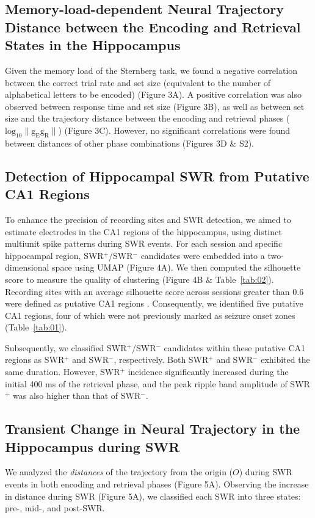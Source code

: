 \documentclass[final,3p,times,twocolumn]{elsarticle}
\begin{document}
\subsection{Memory-load-dependent Neural Trajectory Distance between the Encoding and Retrieval States in the Hippocampus}
Given the memory load of the Sternberg task, we found a negative correlation between the correct trial rate and set size (equivalent to the number of alphabetical letters to be encoded) (Figure 3A). A positive correlation was also observed between response time and set size (Figure 3B), as well as between set size and the trajectory distance between the encoding and retrieval phases ($\mathrm{log_{10}\lVert g_{E}g_{R} \rVert}$) (Figure 3C). However, no significant correlations were found between distances of other phase combinations (Figures 3D \& S2).

\subsection{Detection of Hippocampal SWR from Putative CA1 Regions}
To enhance the precision of recording sites and SWR detection, we aimed to estimate electrodes in the CA1 regions of the hippocampus, using distinct multiunit spike patterns during SWR events. For each session and specific hippocampal region, SWR$^+$/SWR$^-$ candidates were embedded into a two-dimensional space using UMAP (Figure 4A). We then computed the silhouette score to measure the quality of clustering (Figure 4B \& Table~\ref{tab:02}). Recording sites with an average silhouette score across sessions greater than 0.6 were defined as putative CA1 regions \cite{mcinnes_umap_2018, rousseeuw_silhouettes_1987}. Consequently, we identified five putative CA1 regions, four of which were not previously marked as seizure onset zones (Table~\ref{tab:01}).

Subsequently, we classified SWR$^+$/SWR$^-$ candidates within these putative CA1 regions as SWR$^+$ and SWR$^-$, respectively. Both SWR$^+$ and SWR$^-$ exhibited the same duration. However, SWR$^+$ incidence significantly increased during the initial 400 ms of the retrieval phase, and the peak ripple band amplitude of SWR$^+$ was also higher than that of SWR$^-$.

\subsection{Transient Change in Neural Trajectory in the Hippocampus during SWR}
We analyzed the \textit{distances} of the trajectory from the origin ($O$) during SWR events in both encoding and retrieval phases (Figure 5A). Observing the increase in distance during SWR (Figure 5A), we classified each SWR into three states: pre-, mid-, and post-SWR. 
\end{document}
